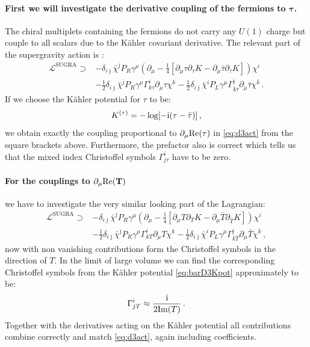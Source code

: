 \documentclass[a4paper,12pt,twoside,openright]{report}
\newcommand{\be}{\begin{equation}}
\newcommand{\ee}{\end{equation}}
\newcommand{\bea}{\begin{equation}\begin{aligned}}
\newcommand{\eea}{\end{aligned}\end{equation}}
\def\rmi{{\rm i}}
\def\jb{{\bar \jmath}}
\def\rmre{{\rm Re}}
\def\rmim{{\rm Im}}
\begin{document}
\paragraph{First we will investigate the derivative coupling of the fermions to $\mathbf{\tau}$.} The chiral multiplets containing the fermions do not carry any $U(1)$ charge but couple to all scalars due to the Kähler covariant derivative. The relevant part of the supergravity action is \cite{Freedman:2012zz}:
\bea
\mathcal{L}^{\text{SUGRA}} \supset &-\delta_{i\jb}\bar{\chi}^\jb P_R \gamma^\mu \left(\partial_\mu - \frac{1}{4}[\partial_\mu \tau\partial_\tau K - \partial_\mu \bar{\tau}\partial_{\bar{\tau}} K] \right) \chi^i\\
&-\frac{1}{2} \delta_{i\jb} \bar{\chi}^\jb P_R \gamma^\mu \Gamma^i_{k\tau}\partial_\mu \tau \chi^k - \frac{1}{2} \delta_{i\jb} \bar{\chi}^i P_L \gamma^\mu \Gamma^\jb_{\bar{k}\bar{\tau}} \partial_\mu \bar{\tau} \chi^{\bar{k}}\,.
\eea 
If we choose the Kähler potential for $\tau$ to be:
\be 
K^{(\tau)} = - \log [-\rmi (\tau -\bar{\tau})]\,,
\ee
we obtain exactly the coupling proportional to $\partial_\mu \rmre(\tau)$ in \eqref{eq:d3act} from the square brackets above. Furthermore, the prefactor also is correct which tells us that the mixed index Christoffel symbols $\Gamma^i_{j\tau}$ have to be zero.
\paragraph{For the couplings to $\mathbf{\partial_\mu \rmre(T)}$} we have to investigate the very similar looking part of the Lagrangian:
\bea
\mathcal{L}^{\text{SUGRA}} \supset & - \delta_{i\jb} \bar{\chi}^\jb P_R \gamma^\mu \left( \partial_\mu -\frac{1}{4} [\partial_\mu T \partial_T K - \partial_\mu \bar{T} \partial_{\bar{T}} K]\right) \chi^i\\
&- \frac{1}{2} \delta_{i\jb} \bar{\chi}^\jb P_R \gamma^\mu \Gamma^i_{kT} \partial_\mu T \chi^k - \frac{1}{2} \delta_{i\jb} \bar{\chi}^i P_L \gamma^\mu \Gamma^{\jb}_{\bar{k}\bar{T}} \partial_\mu \bar{T} \chi^{\bar{k}}\,,
\eea
now with non vanishing contributions form the Christoffel symbols in the direction of $T$. In the limit of large volume we can find the corresponding Christoffel symbols from the Kähler potential \eqref{eq:barD3Kpot} approximately to be:
\be 
\Gamma^{i}_{jT} \approx \frac{\rmi}{2 \rmim(T)}\,.
\ee
Together with the derivatives acting on the Kähler potential all contributions combine correctly and match \eqref{eq:d3act}, again including coefficients.
\end{document}
